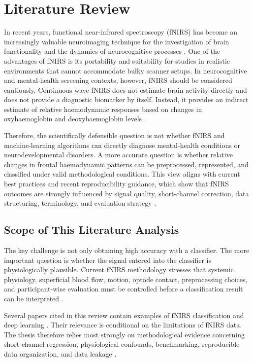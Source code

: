 \section{Literature Review}

In recent years, functional near-infrared spectroscopy (fNIRS) has become an increasingly valuable
neuroimaging technique for the investigation of brain functionality and the dynamics of
neurocognitive processes \cite{Yang2025,Zhan2024}. One of the advantages of fNIRS is its portability
and suitability for studies in realistic environments that cannot accommodate bulky scanner setups.
In neurocognitive and mental-health screening contexts, however, fNIRS should be considered
cautiously. Continuous-wave fNIRS does not estimate brain activity directly and does not provide a
diagnostic biomarker by itself. Instead, it provides an indirect estimate of relative haemodynamic
responses based on changes in oxyhaemoglobin and deoxyhaemoglobin levels
\cite{Yucel2021,Scholkmann2022,Amendola2023}.

Therefore, the scientifically defensible question is not whether fNIRS and machine-learning
algorithms can directly diagnose mental-health conditions or neurodevelopmental disorders. A more
accurate question is whether relative changes in frontal haemodynamic patterns can be preprocessed,
represented, and classified under valid methodological conditions. This view aligns with current
best practices and recent reproducibility guidance, which show that fNIRS outcomes are strongly
influenced by signal quality, short-channel correction, data structuring, terminology, and
evaluation strategy \cite{Yucel2021,Yucel2025,Stute2025,Benerradi2023,Brookshire2024}.

\subsection{Scope of This Literature Analysis}

The key challenge is not only obtaining high accuracy with a classifier. The more important question
is whether the signal entered into the classifier is physiologically plausible. Current fNIRS
methodology stresses that systemic physiology, superficial blood flow, motion, optode contact,
preprocessing choices, and participant-wise evaluation must be controlled before a classification
result can be interpreted \cite{Yucel2021,Scholkmann2022,Klein2024,Yucel2025}.

Several papers cited in this review contain examples of fNIRS classification and deep learning
\cite{Wickramaratne2021,Khan2025,Eastmond2022,Ma2023,Sharmin2026,Qin2024}. Their relevance is
conditional on the limitations of fNIRS data. The thesis therefore relies most strongly on
methodological evidence concerning short-channel regression, physiological confounds, benchmarking,
reproducible data organization, and data leakage
\cite{Wyser2022,Klein2023,Klein2024,An2025,Benerradi2023,Brookshire2024,Luke2025}.

